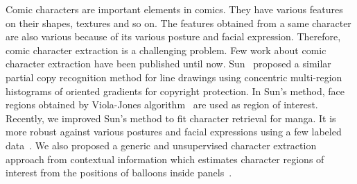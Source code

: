 \documentclass[conference]{IEEEtran}
\begin{document}
  Comic characters are important elements in comics. 
  They have various features on their shapes, textures and so on.
  The features obtained from a same character are also various because of its various posture and facial expression.
  Therefore, comic character extraction is a challenging problem.
  Few work about comic character extraction have been published until now.
  Sun~\cite{Sun2011CopyRecognition} proposed a similar partial copy recognition method for line drawings using concentric multi-region histograms of oriented gradients for copyright protection.
  In Sun's method, face regions obtained by Viola-Jones algorithm~\cite{VJ2011FaceDetect} are used as region of interest.
  Recently, we improved Sun's method to fit character retrieval for manga.
  It is more robust against various postures and facial expressions using a few labeled data~\cite{Iwata2014Retrieval}.
  We also proposed a generic and unsupervised character extraction approach from contextual information which estimates character regions of interest from the positions of balloons inside panels~\cite{Guerin2014Reduction}.
  



\end{document}
